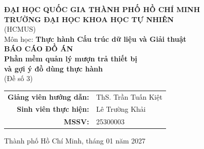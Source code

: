 \begin{titlepage}
\centering
{\large \textbf{ĐẠI HỌC QUỐC GIA THÀNH PHỐ HỒ CHÍ MINH}\\[2pt]
\textbf{TRƯỜNG ĐẠI HỌC KHOA HỌC TỰ NHIÊN}\\[2pt]
(HCMUS)}\\[1.2cm]

{\large Môn học: \textbf{Thực hành Cấu trúc dữ liệu và Giải thuật}}\\[2.2cm]

{\Huge\bfseries BÁO CÁO ĐỒ ÁN}\\[0.8cm]
{\LARGE\bfseries Phần mềm quản lý mượn trả thiết bị\\[4pt]
và gợi ý đồ dùng thực hành}\\[0.6cm]
{\large (Đề số 3)}\\[2.5cm]

\begin{tabular}{rl}
\textbf{Giảng viên hướng dẫn:} & ThS. Trần Tuấn Kiệt\\[6pt]
\textbf{Sinh viên thực hiện:} & Lê Trường Khải\\[6pt]
\textbf{MSSV:} & 25300003\\
\end{tabular}

\vfill
{\large Thành phố Hồ Chí Minh, tháng 01 năm 2027}
\end{titlepage}
